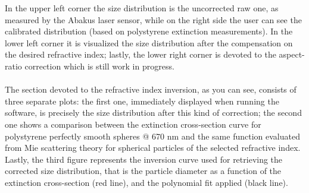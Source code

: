 \documentclass[a4paper, 11pt]{report}
\begin{document}
In the upper left corner the size distribution is the uncorrected raw one, as measured by the Abakus laser sensor, while on the right side the user can see the calibrated distribution (based on polystyrene extinction measurements). In the lower left corner it is visualized the size distribution after the compensation on the desired refractive index; lastly, the lower right corner is devoted to the aspect-ratio correction which is still work in progress. \\ \\
The section devoted to the refractive index inversion, as you can see, consists of three separate plots: the first one, immediately displayed when running the software, is precisely the size distribution after this kind of correction; the second one shows a comparison between the extinction cross-section curve for polystyrene perfectly smooth spheres @ 670 nm and the same function evaluated from Mie scattering theory for spherical particles of the selected refractive index.
Lastly, the third figure represents the inversion curve used for retrieving the corrected size distribution, that is the  particle diameter as a function of the extinction cross-section (red line), and the polynomial fit applied (black line).
\newpage
\end{document}
